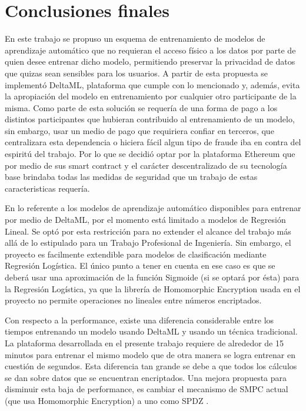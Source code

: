 \documentclass[
11pt, %
oneside, %
spanish, %
singlespacing, %
parskip, %
headsepline, %
chapterinoneline, %
]{MastersDoctoralThesis} %
\begin{document}
\chapter{Conclusiones finales}
En este trabajo se propuso un esquema de entrenamiento de modelos de aprendizaje automático que no requieran el acceso físico a los datos por parte de quien desee entrenar dicho modelo, permitiendo preservar la privacidad de datos que quizas sean sensibles para los usuarios. A partir de esta propuesta se implementó DeltaML, plataforma que cumple con lo mencionado y, además, evita la apropiación del modelo en entrenamiento por cualquier otro participante de la misma. Como parte de esta solución se requería de una forma de pago a los distintos participantes que hubieran contribuido al entrenamiento de un modelo, sin embargo, usar un medio de pago que requiriera confiar en terceros, que centralizara esta dependencia o hiciera fácil algun tipo de fraude iba en contra del espiritú del trabajo. Por lo que se decidió optar por la plataforma Ethereum que por medio de sus smart contract y el carácter descentralizado de su tecnología base brindaba todas las medidas de seguridad que un trabajo de estas caracteristicas requería.

En lo referente a los modelos de aprendizaje automático disponibles para entrenar por medio de DeltaML, por el momento está limitado a modelos de Regresión Lineal. Se optó por esta restricción para no extender el alcance del trabajo más allá de lo estipulado para un Trabajo Profesional de Ingeniería. Sin embargo, el proyecto es facilmente extendible para modelos de clasificación mediante Regresión Logística. El único punto a tener en cuenta en ese caso es que se deberá usar una aproximación de la función Sigmoide (si se optará por ésta) para la Regresión Logística, ya que la librería de Homomorphic Encryption usada en el proyecto no permite operaciones no lineales entre números encriptados.

Con respecto a la performance, existe una diferencia considerable entre los tiempos entrenando un modelo usando DeltaML y usando un técnica tradicional. La plataforma desarrollada en el presente trabajo requiere de alrededor de 15 minutos para entrenar el mismo modelo que de otra manera se logra entrenar en cuestión de segundos. Esta diferencia tan grande se debe a que todos los cálculos se dan sobre datos que se encuentran encriptados.  Una mejora propuesta para disminuir esta baja de performance, es cambiar el mecanismo de SMPC actual (que usa Homomorphic Encryption) a uno como SPDZ \citep{spdz-1} \citep{spdz-2} \cite{spdz-prot} \cite{mpc-spdz}. 
\end{document}
